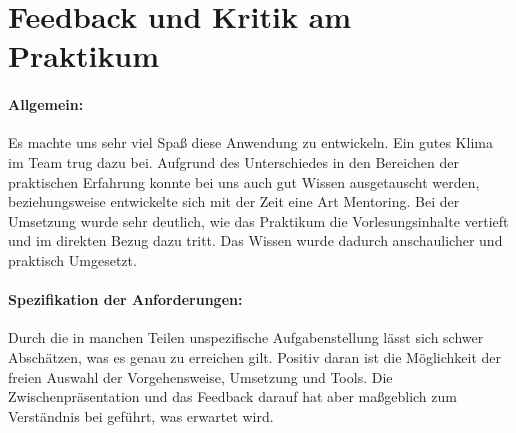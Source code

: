 
\section{Feedback und Kritik am Praktikum}

\paragraph{Allgemein:} Es machte uns sehr viel Spaß diese Anwendung zu entwickeln. Ein gutes Klima im Team trug dazu bei. 
Aufgrund des Unterschiedes in den Bereichen der praktischen Erfahrung konnte bei uns auch gut Wissen ausgetauscht werden, beziehungsweise entwickelte sich mit der Zeit eine Art Mentoring.
Bei der Umsetzung wurde sehr deutlich, wie das Praktikum die Vorlesungsinhalte vertieft und im direkten Bezug dazu tritt. Das Wissen wurde dadurch anschaulicher und praktisch Umgesetzt. 


\paragraph{Spezifikation der Anforderungen:} Durch die in manchen Teilen unspezifische Aufgabenstellung lässt sich schwer Abschätzen, was es genau zu erreichen gilt. 
Positiv daran ist die Möglichkeit der freien Auswahl der Vorgehensweise, Umsetzung und Tools. 
Die Zwischenpräsentation und das Feedback darauf hat aber maßgeblich zum Verständnis bei geführt, was erwartet wird.